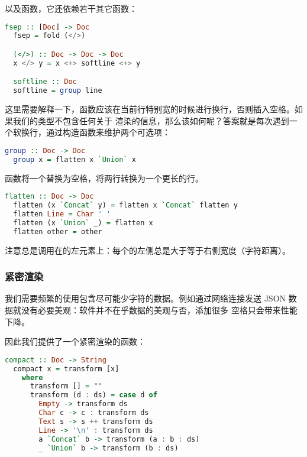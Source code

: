 \documentclass[./main.tex]{subfiles}
\begin{document}
以及函数，它还依赖若干其它函数：

\begin{lstlisting}[language=Haskell]
  fsep :: [Doc] -> Doc
  fsep = fold (</>)

  (</>) :: Doc -> Doc -> Doc
  x </> y = x <+> softline <+> y

  softline :: Doc
  softline = group line
\end{lstlisting}

这里需要解释一下，函数应该在当前行特别宽的时候进行换行，否则插入空格。如果我们的类型不包含任何关于
渲染的信息，那么该如何呢？答案就是每次遇到一个软换行，通过构造函数来维护两个可选项：

\begin{lstlisting}[language=Haskell]
  group :: Doc -> Doc
  group x = flatten x `Union` x
\end{lstlisting}

函数将一个替换为空格，将两行转换为一个更长的行。

\begin{lstlisting}[language=Haskell]
  flatten :: Doc -> Doc
  flatten (x `Concat` y) = flatten x `Concat` flatten y
  flatten Line = Char ' '
  flatten (x `Union` _) = flatten x
  flatten other = other
\end{lstlisting}

注意总是调用在的左元素上：每个的左侧总是大于等于右侧宽度（字符距离）。

\subsubsection*{紧密渲染}

我们需要频繁的使用包含尽可能少字符的数据。例如通过网络连接发送 JSON 数据就没有必要美观：软件并不在乎数据的美观与否，添加很多
空格只会带来性能下降。

因此我们提供了一个紧密渲染的函数：

\begin{lstlisting}[language=Haskell]
  compact :: Doc -> String
  compact x = transform [x]
    where
      transform [] = ""
      transform (d : ds) = case d of
        Empty -> transform ds
        Char c -> c : transform ds
        Text s -> s ++ transform ds
        Line -> '\n' : transform ds
        a `Concat` b -> transform (a : b : ds)
        _ `Union` b -> transform (b : ds)
\end{lstlisting}
\end{document}
